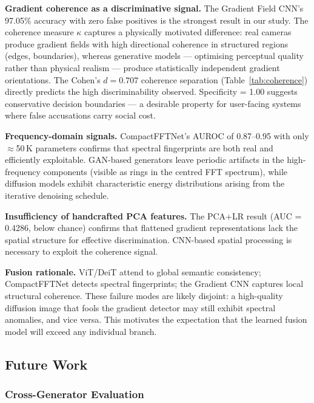 \documentclass[12pt, a4paper]{article}
\begin{document}
\textbf{Gradient coherence as a discriminative signal.}
The Gradient Field CNN's 97.05\% accuracy with zero false positives is the
strongest result in our study.  The coherence measure $\kappa$ captures a
physically motivated difference: real cameras produce gradient fields with high
directional coherence in structured regions (edges, boundaries), whereas
generative models — optimising perceptual quality rather than physical realism —
produce statistically independent gradient orientations.  The Cohen's
$d=0.707$ coherence separation (Table~\ref{tab:coherence}) directly predicts the
high discriminability observed.  Specificity = 1.00 suggests conservative
decision boundaries — a desirable property for user-facing systems where false
accusations carry social cost.

\textbf{Frequency-domain signals.}
CompactFFTNet's AUROC of 0.87–0.95 with only $\approx$50\,K parameters confirms
that spectral fingerprints are both real and efficiently exploitable.  GAN-based
generators leave periodic artifacts in the high-frequency components (visible as
rings in the centred FFT spectrum), while diffusion models exhibit characteristic
energy distributions arising from the iterative denoising schedule.

\textbf{Insufficiency of handcrafted PCA features.}
The PCA+LR result (AUC = 0.4286, below chance) confirms that flattened gradient
representations lack the spatial structure for effective discrimination.
CNN-based spatial processing is necessary to exploit the coherence signal.

\textbf{Fusion rationale.}
ViT/DeiT attend to global semantic consistency; CompactFFTNet detects spectral
fingerprints; the Gradient CNN captures local structural coherence.  These failure
modes are likely disjoint: a high-quality diffusion image that fools the gradient
detector may still exhibit spectral anomalies, and vice versa.  This motivates
the expectation that the learned fusion model will exceed any individual branch.

\subsection{Future Work}
\label{sec:future}

\subsubsection{Cross-Generator Evaluation}
\end{document}
